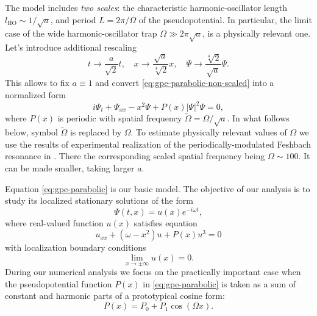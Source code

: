 The model includes {\it two scales}: the characteristic harmonic-oscillator length $l_{\mathrm{HO}} \sim 1 / \sqrt{a}$, and period $L = 2 \pi / \Omega$ of the pseudopotential.
In particular, the limit case of the wide harmonic-oscillator trap $\Omega \gg 2 \pi \sqrt{a}$, is a physically relevant one.
Let's introduce additional rescaling
\begin{equation}
	t \to \dfrac{a}{\sqrt{2}} t, \quad x \to \dfrac{\sqrt{a}}{\sqrt[4]{2}} x, \quad \Psi \to \dfrac{\sqrt[4]{2}}{\sqrt{a}} \Psi.
\end{equation}
This allows to fix $a \equiv 1$ and convert \eqref{eq:gpe-parabolic-non-scaled} into a normalized form
\begin{equation}
	i \Psi_t + \Psi_{xx} - x^2 \Psi + P(x) |\Psi|^2 \Psi = 0,
\label{eq:gpe-parabolic}
\end{equation}
where $P(x)$ is periodic with spatial frequency $\widetilde{\Omega} = \Omega / \sqrt{a}$.
In what follows below, symbol $\widetilde{\Omega}$ is replaced by $\Omega$.
To estimate physically relevant values of $\Omega$ we use the results of experimental realization of the periodically-modulated Feshbach resonance in \cite{YamazakiTaieSugawaTakahashi}.
There the corresponding scaled spatial frequency being $\Omega \sim 100$.
It can be made smaller, taking larger $a$.

Equation \eqref{eq:gpe-parabolic} is our basic model.
The objective of our analysis is to study its localized stationary solutions of the form
\begin{equation}
	\Psi(t, x) = u(x) e^{-i \omega t},
\end{equation}
where real-valued function $u(x)$ satisfies equation
\begin{equation}
	u_{xx} + (\omega - x^2) u + P(x) u^3 = 0
\label{eq:nho-periodic}
\end{equation}
with localization boundary conditions
\begin{equation}
	\lim \limits_{x \to \pm \infty} u(x) = 0.
\end{equation}
During our numerical analysis we focus on the practically important case when the pseudopotential function $P(x)$ in \eqref{eq:gpe-parabolic} is taken as a sum of constant and harmonic parts of a prototypical cosine form:
\begin{equation}
	P(x) = P_0 + P_1 \cos (\Omega x).
\label{eq:gpe-parabolic-pseudopotential}
\end{equation}

